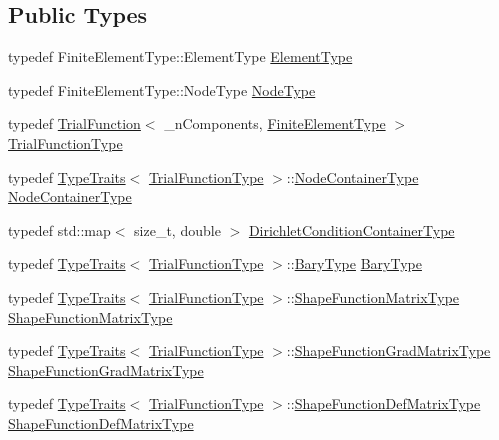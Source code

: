 \subsection*{Public Types}
\begin{DoxyCompactItemize}
\item 
typedef Finite\+Element\+Type\+::\+Element\+Type \hyperlink{classmodel_1_1_trial_function_a72000c5b5030b4738f1d54f149519a78}{Element\+Type}
\item 
typedef Finite\+Element\+Type\+::\+Node\+Type \hyperlink{classmodel_1_1_trial_function_abfb27d5003b203df9a1a34f81efb49c1}{Node\+Type}
\item 
typedef \hyperlink{classmodel_1_1_trial_function}{Trial\+Function}$<$ \+\_\+n\+Components, \hyperlink{classmodel_1_1_trial_function_affdabe3315d0208c9b2210c3cbee6d42}{Finite\+Element\+Type} $>$ \hyperlink{classmodel_1_1_trial_function_a7f044ad0cacd2e9026ea7a3861e0df9a}{Trial\+Function\+Type}
\item 
typedef \hyperlink{structmodel_1_1_type_traits}{Type\+Traits}$<$ \hyperlink{classmodel_1_1_trial_function_a7f044ad0cacd2e9026ea7a3861e0df9a}{Trial\+Function\+Type} $>$\+::\hyperlink{classmodel_1_1_trial_function_a830ac33c6efd0f2022269cfc2c522388}{Node\+Container\+Type} \hyperlink{classmodel_1_1_trial_function_a830ac33c6efd0f2022269cfc2c522388}{Node\+Container\+Type}
\item 
typedef std\+::map$<$ size\+\_\+t, double $>$ \hyperlink{classmodel_1_1_trial_function_ae83a85333510ff0e0823e6cb748774ed}{Dirichlet\+Condition\+Container\+Type}
\item 
typedef \hyperlink{structmodel_1_1_type_traits}{Type\+Traits}$<$ \hyperlink{classmodel_1_1_trial_function_a7f044ad0cacd2e9026ea7a3861e0df9a}{Trial\+Function\+Type} $>$\+::\hyperlink{classmodel_1_1_trial_function_af4bd713419cc83660594065c9392bf2c}{Bary\+Type} \hyperlink{classmodel_1_1_trial_function_af4bd713419cc83660594065c9392bf2c}{Bary\+Type}
\item 
typedef \hyperlink{structmodel_1_1_type_traits}{Type\+Traits}$<$ \hyperlink{classmodel_1_1_trial_function_a7f044ad0cacd2e9026ea7a3861e0df9a}{Trial\+Function\+Type} $>$\+::\hyperlink{classmodel_1_1_trial_function_aab74b7f4994594a049e4a0201ecd0770}{Shape\+Function\+Matrix\+Type} \hyperlink{classmodel_1_1_trial_function_aab74b7f4994594a049e4a0201ecd0770}{Shape\+Function\+Matrix\+Type}
\item 
typedef \hyperlink{structmodel_1_1_type_traits}{Type\+Traits}$<$ \hyperlink{classmodel_1_1_trial_function_a7f044ad0cacd2e9026ea7a3861e0df9a}{Trial\+Function\+Type} $>$\+::\hyperlink{classmodel_1_1_trial_function_adf8d15a6967d142e4b5807db94294f66}{Shape\+Function\+Grad\+Matrix\+Type} \hyperlink{classmodel_1_1_trial_function_adf8d15a6967d142e4b5807db94294f66}{Shape\+Function\+Grad\+Matrix\+Type}
\item 
typedef \hyperlink{structmodel_1_1_type_traits}{Type\+Traits}$<$ \hyperlink{classmodel_1_1_trial_function_a7f044ad0cacd2e9026ea7a3861e0df9a}{Trial\+Function\+Type} $>$\+::\hyperlink{classmodel_1_1_trial_function_a91023734ad775d5608a8672e9fe00f5c}{Shape\+Function\+Def\+Matrix\+Type} \hyperlink{classmodel_1_1_trial_function_a91023734ad775d5608a8672e9fe00f5c}{Shape\+Function\+Def\+Matrix\+Type}
\end{DoxyCompactItemize}
